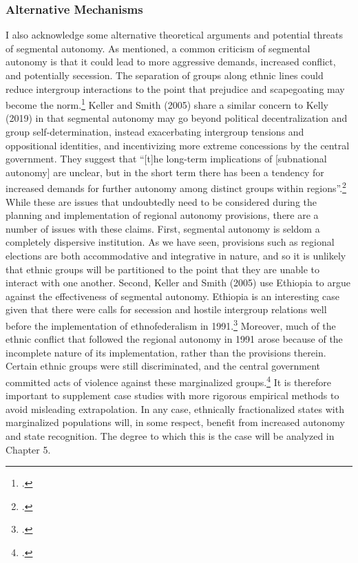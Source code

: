 \documentclass[12pt]{article}
\begin{document}
\subsubsection{Alternative Mechanisms}
I also acknowledge some alternative theoretical arguments and potential threats of segmental autonomy. As mentioned, a common criticism of segmental autonomy is that it could lead to more aggressive demands, increased conflict, and potentially secession. The separation of groups along ethnic lines could reduce intergroup interactions to the point that prejudice and scapegoating may become the norm.\footcite{kelly_power-sharing_2019} Keller and Smith (2005) share a similar concern to Kelly (2019) in that segmental autonomy may go beyond political decentralization and group self-determination, instead exacerbating intergroup tensions and oppositional identities, and incentivizing more extreme concessions by the central government. They suggest that ``[t]he long-term implications of [subnational autonomy] are unclear, but in the short term there has been a tendency for increased demands for further autonomy among distinct groups within regions''.\footcite[240]{keller_obstacle_2005} While these are issues that undoubtedly need to be considered during the planning and implementation of regional autonomy provisions, there are a number of issues with these claims. First, segmental autonomy is seldom a completely dispersive institution. As we have seen, provisions such as regional elections are both accommodative and integrative in nature, and so it is unlikely that ethnic groups will be partitioned to the point that they are unable to interact with one another. Second, Keller and Smith (2005) use Ethiopia to argue against the effectiveness of segmental autonomy. Ethiopia is an interesting case given that there were calls for secession and hostile intergroup relations well before the implementation of ethnofederalism in 1991.\footcite{vogt_integrating_2015} Moreover, much of the ethnic conflict that followed the regional autonomy in 1991 arose because of the incomplete nature of its implementation, rather than the provisions therein. Certain ethnic groups were still discriminated, and the central government committed acts of violence against these marginalized groups.\footcite{vogt_integrating_2015} It is therefore important to supplement case studies with more rigorous empirical methods to avoid misleading extrapolation. In any case, ethnically fractionalized states with marginalized populations will, in some respect, benefit from increased autonomy and state recognition. The degree to which this is the case will be analyzed in Chapter 5.
\end{document}
